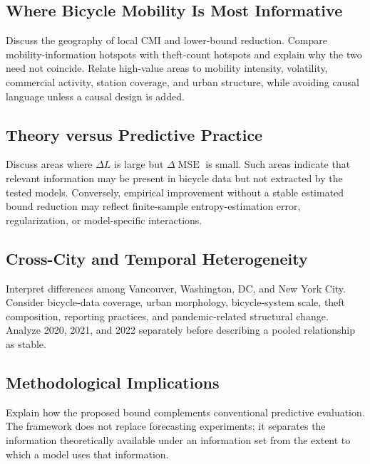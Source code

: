 \documentclass[applsci,article,submit,moreauthors]{Definitions/mdpi}
\begin{document}
\subsection{Where Bicycle Mobility Is Most Informative}
Discuss the geography of local CMI and lower-bound reduction. Compare mobility-information hotspots with theft-count hotspots and explain why the two need not coincide. Relate high-value areas to mobility intensity, volatility, commercial activity, station coverage, and urban structure, while avoiding causal language unless a causal design is added.

\subsection{Theory versus Predictive Practice}
Discuss areas where $\Delta L$ is large but $\Delta\operatorname{MSE}$ is small. Such areas indicate that relevant information may be present in bicycle data but not extracted by the tested models. Conversely, empirical improvement without a stable estimated bound reduction may reflect finite-sample entropy-estimation error, regularization, or model-specific interactions.

\subsection{Cross-City and Temporal Heterogeneity}
Interpret differences among Vancouver, Washington, DC, and New York City. Consider bicycle-data coverage, urban morphology, bicycle-system scale, theft composition, reporting practices, and pandemic-related structural change. Analyze 2020, 2021, and 2022 separately before describing a pooled relationship as stable.

\subsection{Methodological Implications}
Explain how the proposed bound complements conventional predictive evaluation. The framework does not replace forecasting experiments; it separates the information theoretically available under an information set from the extent to which a model uses that information.
\end{document}
